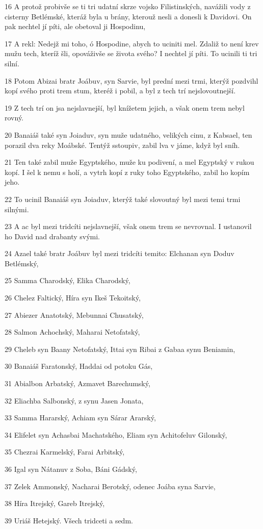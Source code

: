 \par 16 A protož probivše se ti tri udatní skrze vojsko Filistinských, navážili vody z cisterny Betlémské, kteráž byla u brány, kterouž nesli a donesli k Davidovi. On pak nechtel jí píti, ale obetoval ji Hospodinu,
\par 17 A rekl: Nedejž mi toho, ó Hospodine, abych to uciniti mel. Zdaliž to není krev mužu tech, kteríž šli, opováživše se života svého? I nechtel jí píti. To ucinili ti tri silní.
\par 18 Potom Abizai bratr Joábuv, syn Sarvie, byl prední mezi trmi, kterýž pozdvihl kopí svého proti trem stum, kteréž i pobil, a byl z tech trí nejslovoutnejší.
\par 19 Z tech trí on jsa nejslavnejší, byl knížetem jejich, a však onem trem nebyl rovný.
\par 20 Banaiáš také syn Joiaduv, syn muže udatného, velikých cinu, z Kabsael, ten porazil dva reky Moábské. Tentýž sstoupiv, zabil lva v jáme, když byl sníh.
\par 21 Ten také zabil muže Egyptského, muže ku podivení, a mel Egyptský v rukou kopí. I šel k nemu s holí, a vytrh kopí z ruky toho Egyptského, zabil ho kopím jeho.
\par 22 To ucinil Banaiáš syn Joiaduv, kterýž také slovoutný byl mezi temi trmi silnými.
\par 23 A ac byl mezi tridcíti nejslavnejší, však onem trem se nevrovnal. I ustanovil ho David nad drabanty svými.
\par 24 Azael také bratr Joábuv byl mezi tridcíti temito: Elchanan syn Doduv Betlémský,
\par 25 Samma Charodský, Elika Charodský,
\par 26 Chelez Faltický, Híra syn Ikeš Tekoitský,
\par 27 Abiezer Anatotský, Mebunnai Chusatský,
\par 28 Salmon Achochský, Maharai Netofatský,
\par 29 Cheleb syn Baany Netofatský, Ittai syn Ribai z Gabaa synu Beniamin,
\par 30 Banaiáš Faratonský, Haddai od potoku Gás,
\par 31 Abialbon Arbatský, Azmavet Barechumský,
\par 32 Eliachba Salbonský, z synu Jasen Jonata,
\par 33 Samma Hararský, Achiam syn Sárar Ararský,
\par 34 Elifelet syn Achasbai Machatského, Eliam syn Achitofeluv Gilonský,
\par 35 Chezrai Karmelský, Farai Arbitský,
\par 36 Igal syn Nátanuv z Soba, Báni Gádský,
\par 37 Zelek Ammonský, Nacharai Berotský, odenec Joába syna Sarvie,
\par 38 Híra Itrejský, Gareb Itrejský,
\par 39 Uriáš Hetejský. Všech tridceti a sedm.


